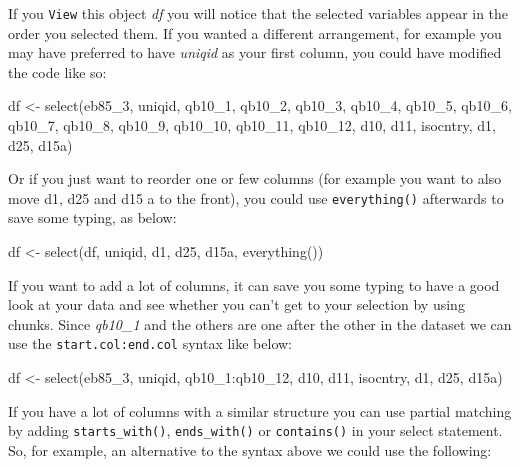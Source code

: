 \documentclass[
]{book}
\newenvironment{Shaded}{\begin{snugshade}}{\end{snugshade}}
\newcommand{\FunctionTok}[1]{\textcolor[rgb]{0.00,0.00,0.00}{#1}}
\newcommand{\NormalTok}[1]{#1}
\newcommand{\OtherTok}[1]{\textcolor[rgb]{0.56,0.35,0.01}{#1}}
\newcommand{\SpecialCharTok}[1]{\textcolor[rgb]{0.00,0.00,0.00}{#1}}
\begin{document}
If you \texttt{View} this object \emph{df} you will notice that the selected variables appear in the order you selected them. If you wanted a different arrangement, for example you may have preferred to have \emph{uniqid} as your first column, you could have modified the code like so:

\begin{Shaded}
\begin{Highlighting}[]
\NormalTok{df }\OtherTok{\textless{}{-}} \FunctionTok{select}\NormalTok{(eb85\_3, uniqid, qb10\_1, qb10\_2, qb10\_3, qb10\_4,}
\NormalTok{             qb10\_5, qb10\_6, qb10\_7, qb10\_8, qb10\_9,}
\NormalTok{             qb10\_10, qb10\_11, qb10\_12, d10, d11,}
\NormalTok{             isocntry, d1, d25, d15a)}
\end{Highlighting}
\end{Shaded}

Or if you just want to reorder one or few columns (for example you want to also move d1, d25 and d15 a to the front), you could use \texttt{everything()} afterwards to save some typing, as below:

\begin{Shaded}
\begin{Highlighting}[]
\NormalTok{df }\OtherTok{\textless{}{-}} \FunctionTok{select}\NormalTok{(df, uniqid, d1, d25, d15a, }\FunctionTok{everything}\NormalTok{())}
\end{Highlighting}
\end{Shaded}

If you want to add a lot of columns, it can save you some typing to have a good look at your data and see whether you can't get to your selection by using chunks. Since \emph{qb10\_1} and the others are one after the other in the dataset we can use the \texttt{start.col:end.col} syntax like below:

\begin{Shaded}
\begin{Highlighting}[]
\NormalTok{df }\OtherTok{\textless{}{-}} \FunctionTok{select}\NormalTok{(eb85\_3, uniqid, qb10\_1}\SpecialCharTok{:}\NormalTok{qb10\_12, d10, d11,}
\NormalTok{             isocntry, d1, d25, d15a)}
\end{Highlighting}
\end{Shaded}

If you have a lot of columns with a similar structure you can use partial matching by adding \texttt{starts\_with()}, \texttt{ends\_with()} or \texttt{contains()} in your select statement. So, for example, an alternative to the syntax above we could use the following:
\end{document}

